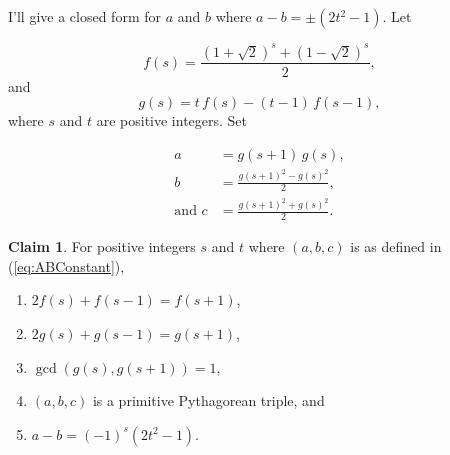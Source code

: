 \documentclass{article}
\theoremstyle{definition}
\newtheorem{claim}{Claim}
\begin{document}
I'll give a closed form for \(a\) and \(b\) where  \(a-b = \pm
(2t^2-1)\). Let

\begin{equation}
f(s) = \frac{(1+\sqrt{2})^s + (1-\sqrt{2})^s}{2},
\end{equation}
and
\begin{equation}
g(s) = t\, f(s) - (t-1)\, f(s-1),
\end{equation}
where \(s\) and \(t\) are positive integers. Set

\begin{equation}
\begin{aligned}
a &= g(s+1)\, g(s), \\
b &= \frac{g(s+1)^2 - g(s)^2}{2}, \\
\text{and } c &= \frac{g(s+1)^2 + g(s)^2}{2}.
\end{aligned}
\label{eq:ABConstant}
\end{equation}

\begin{claim}
For positive integers \(s\) and \(t\) where \((a,b,c)\) is as defined in (\ref{eq:ABConstant}),
\begin{enumerate}
\item \(2f(s) + f(s-1) = f(s+1)\),
\item \(2g(s) + g(s-1) = g(s+1)\),
\item \(\gcd(g(s), g(s+1)) = 1\),
\item \((a,b,c)\) is a primitive Pythagorean triple, and
\item \(a-b = (-1)^s (2t^2 - 1)\).
\end{enumerate}
\end{claim}
\end{document}

